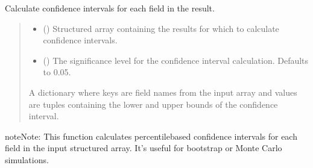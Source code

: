 \documentclass[letterpaper,10pt,english]{sphinxmanual}
\begin{document}

\begin{fulllineitems}
\label{\detokenize{calzone:calzone.metrics.get_CI}}
\pysigstartsignatures
{}
\pysigstopsignatures
\sphinxAtStartPar
Calculate confidence intervals for each field in the result.
\begin{quote}\begin{description}
\begin{itemize}
\item {} 
\sphinxAtStartPar
{} () \textendash{} Structured array containing the results for which to calculate confidence intervals.

\item {} 
\sphinxAtStartPar
{} (\sphinxstyleliteralemphasis{\sphinxupquote{, }}) \textendash{} The significance level for the confidence interval calculation. Defaults to 0.05.

\end{itemize}

\sphinxAtStartPar
{} \textendash{} A dictionary where keys are field names from the input array and values
are tuples containing the lower and upper bounds of the confidence interval.

\end{description}\end{quote}

\begin{sphinxadmonition}{note}{Note:}
\sphinxAtStartPar
This function calculates percentile\sphinxhyphen{}based confidence intervals for each field
in the input structured array. It’s useful for bootstrap or Monte Carlo simulations.
\end{sphinxadmonition}

\end{fulllineitems}

\end{document}
